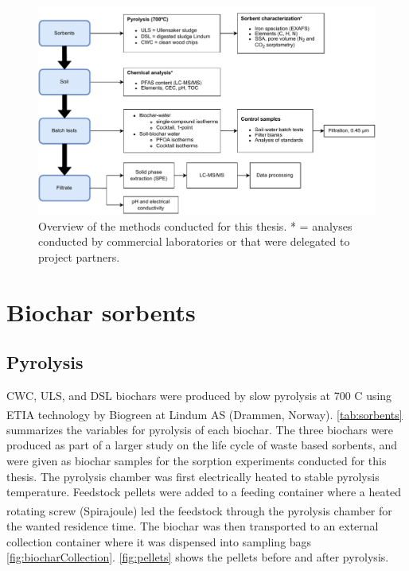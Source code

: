 \begin{figure}
    \centering
    \includegraphics[width=\textwidth]{Diagrams/Methods-General_overview_methods.pdf}
    \caption{Overview of the methods conducted for this thesis. * = analyses conducted by commercial laboratories or that were delegated to project partners.}
    \label{fig:methodoverview}
\end{figure}

\section{Biochar sorbents}
\subsection{Pyrolysis}
CWC, ULS, and DSL biochars were produced by slow pyrolysis at 700 \textdegree C using ETIA technology by Biogreen\textsuperscript{\textcopyright} at Lindum AS (Drammen, Norway). \cref{tab:sorbents} summarizes the variables for pyrolysis of each biochar. The three biochars were produced as part of a larger study on the life cycle of waste based sorbents, and were given as biochar samples for the sorption experiments conducted for this thesis. The pyrolysis chamber was first electrically heated to stable pyrolysis temperature. Feedstock pellets were added to a feeding container where a heated rotating screw (Spirajoule\textsuperscript{\textregistered}) led the feedstock through the pyrolysis chamber for the wanted residence time. The biochar was then transported to an external collection container where it was dispensed into sampling bags \cref{fig:biocharCollection}. \cref{fig:pellets} shows the pellets before and after pyrolysis. 

